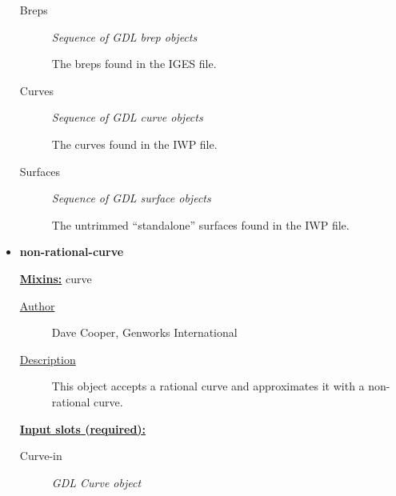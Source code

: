 \documentclass [11pt]{book}
\begin{document}
\begin{itemize}
\begin{description}

\item [Breps]
\emph{Sequence of GDL brep objects}

 The breps found in the IGES file.




\item [Curves]
\emph{Sequence of GDL curve objects}

 The curves found in the IWP file.




\item [Surfaces]
\emph{Sequence of GDL surface objects}

 The untrimmed ``standalone'' surfaces found in the IWP file.




\end{description}







\item {}
\label{prim:non-rational-curve}
\textbf{non-rational-curve}


\textbf{
\underline{Mixins:}} curve





\begin{description}

\item [
\underline{Author}]


Dave Cooper, Genworks International



\item [
\underline{Description}]


This object accepts a rational curve and approximates it with a non-rational curve.



\end{description}








\textbf{
\underline{Input slots (required):}}

\begin{description}

\item [Curve-in]
\emph{GDL Curve object}


\end{description}
\end{itemize}
\end{document}
